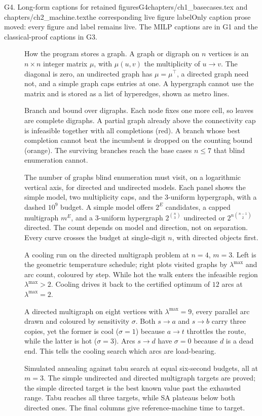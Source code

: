 \begin{offcut}{G4. Long-form captions for retained figures}{G4}{chapters/ch1\_basecases.tex and chapters/ch2\_machine.tex}{the corresponding live figure label}{Only caption prose moved: every figure and label remains live. The MILP captions are in G1 and the classical-proof captions in G3.}
\begin{description}
\item[]
How the program stores a graph. A graph or digraph on $n$ vertices is an $n\times n$ integer matrix $\mu$, with $\mu(u,v)$ the multiplicity of $u\to v$. The diagonal is zero, an undirected graph has $\mu=\mu^\top$, a directed graph need not, and a simple graph caps entries at one. A hypergraph cannot use the matrix and is stored as a list of hyperedges, shown as metro lines.

\item[]
Branch and bound over digraphs. Each node fixes one more cell, so leaves are complete digraphs. A partial graph already above the connectivity cap is infeasible together with all completions (red). A branch whose best completion cannot beat the incumbent is dropped on the counting bound (orange). The surviving branches reach the base cases $n\le7$ that blind enumeration cannot.

\item[]
The number of graphs blind enumeration must visit, on a logarithmic vertical axis, for directed and undirected models. Each panel shows the simple model, two multiplicity caps, and the $3$-uniform hypergraph, with a dashed $10^9$ budget. A simple model offers $2^E$ candidates, a capped multigraph $m^E$, and a $3$-uniform hypergraph $2^{\binom n3}$ undirected or $2^{n\binom{n-1}{2}}$ directed. The count depends on model and direction, not on separation. Every curve crosses the budget at single-digit $n$, with directed objects first.

\item[]
A cooling run on the directed multigraph problem at $n=4$, $m=3$. Left is the geometric temperature schedule; right plots visited graphs by $\lambda^{\max}$ and arc count, coloured by step. While hot the walk enters the infeasible region $\lambda^{\max}>2$. Cooling drives it back to the certified optimum of $12$ arcs at $\lambda^{\max}=2$.

\item[]
A directed multigraph on eight vertices with $\lambda^{\max}=9$, every parallel arc drawn and coloured by sensitivity $\sigma$. Both $s\to a$ and $s\to b$ carry three copies, yet the former is cool ($\sigma=1$) because $a\to t$ throttles the route, while the latter is hot ($\sigma=3$). Arcs $s\to d$ have $\sigma=0$ because $d$ is a dead end. This tells the cooling search which arcs are load-bearing.

\item[]
Simulated annealing against tabu search at equal six-second budgets, all at $m=3$. The simple undirected and directed multigraph targets are proved; the simple directed target is the best known value past the exhausted range. Tabu reaches all three targets, while SA plateaus below both directed ones. The final columns give reference-machine time to target.


\end{description}
\end{offcut}
